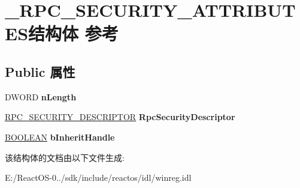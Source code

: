 \hypertarget{struct___r_p_c___s_e_c_u_r_i_t_y___a_t_t_r_i_b_u_t_e_s}{}\section{\+\_\+\+R\+P\+C\+\_\+\+S\+E\+C\+U\+R\+I\+T\+Y\+\_\+\+A\+T\+T\+R\+I\+B\+U\+T\+E\+S结构体 参考}
\label{struct___r_p_c___s_e_c_u_r_i_t_y___a_t_t_r_i_b_u_t_e_s}
\subsection*{Public 属性}
\begin{DoxyCompactItemize}
\item 
\mbox{\label{struct___r_p_c___s_e_c_u_r_i_t_y___a_t_t_r_i_b_u_t_e_s_afea20d7e32da9078e9e80a51576f2022}} 
D\+W\+O\+RD {\bfseries n\+Length}
\item 
\mbox{\label{struct___r_p_c___s_e_c_u_r_i_t_y___a_t_t_r_i_b_u_t_e_s_a5aaa2498e36c222bcfb4de260ee3a49f}} 
\hyperlink{struct___r_p_c___s_e_c_u_r_i_t_y___d_e_s_c_r_i_p_t_o_r}{R\+P\+C\+\_\+\+S\+E\+C\+U\+R\+I\+T\+Y\+\_\+\+D\+E\+S\+C\+R\+I\+P\+T\+OR} {\bfseries Rpc\+Security\+Descriptor}
\item 
\mbox{\label{struct___r_p_c___s_e_c_u_r_i_t_y___a_t_t_r_i_b_u_t_e_s_a9acf90bb0d63e935f8b283789d4fa148}} 
\hyperlink{_processor_bind_8h_a112e3146cb38b6ee95e64d85842e380a}{B\+O\+O\+L\+E\+AN} {\bfseries b\+Inherit\+Handle}
\end{DoxyCompactItemize}


该结构体的文档由以下文件生成\+:\begin{DoxyCompactItemize}
\item 
E\+:/\+React\+O\+S-\/0../sdk/include/reactos/idl/winreg.\+idl\end{DoxyCompactItemize}
